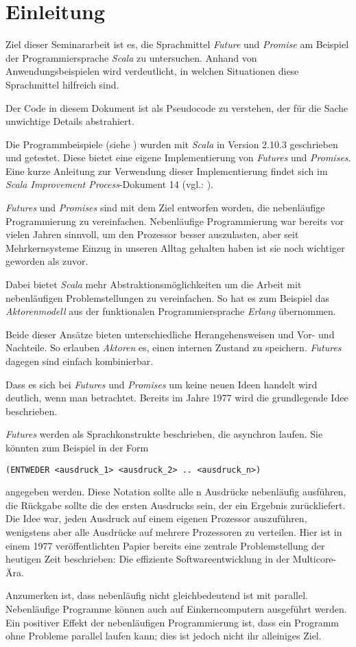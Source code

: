 \section{Einleitung}

Ziel dieser Seminararbeit ist es, die Sprachmittel \emph{Future}
und \emph{Promise} am Beispiel der Programmiersprache \emph{Scala}
zu untersuchen. Anhand von Anwendungsbeispielen wird verdeutlicht, 
in welchen Situationen diese Sprachmittel hilfreich sind.

Der Code in diesem Dokument ist als Pseudocode zu verstehen, der für die
Sache unwichtige Details abstrahiert.

Die Programmbeispiele (siehe \cite{code}) wurden mit
\emph{Scala} in Version 2.10.3 geschrieben und getestet. Diese bietet
eine eigene Implementierung von \emph{Futures} und \emph{Promises}.
Eine kurze Anleitung zur Verwendung dieser Implementierung findet sich im
\emph{Scala Improvement Process}-Dokument 14 (vgl.: \cite{sip14}).

\emph{Futures} und \emph{Promises} sind mit dem Ziel entworfen worden,
die nebenläufige Programmierung zu vereinfachen. Nebenläufige Programmierung
war bereits vor vielen Jahren sinnvoll, um den Prozessor besser auszulasten,
aber seit Mehrkernsysteme Einzug in unseren Alltag gehalten haben
ist sie noch wichtiger geworden als zuvor.

Dabei bietet \emph{Scala} mehr Abstraktionsmöglichkeiten um die Arbeit
mit nebenläufigen Problemstellungen zu vereinfachen. So hat es zum
Beispiel das \emph{Aktorenmodell} aus der funktionalen Programmiersprache
\emph{Erlang} übernommen.

Beide dieser Ansätze bieten unterschiedliche Herangehensweisen und
Vor- und Nachteile. So erlauben \emph{Aktoren} es, einen internen Zustand
zu speichern. \emph{Futures} dagegen sind einfach kombinierbar.

Dass es sich bei \emph{Futures} und \emph{Promises} um keine neuen
Ideen handelt wird deutlich, wenn man \cite{Baker:1977:IGC:872734.806932}
betrachtet. Bereits im Jahre 1977 wird die grundlegende Idee beschrieben.

\emph{Futures} werden als Sprachkonstrukte beschrieben, die asynchron laufen. Sie 
könnten zum Beispiel in der Form 
\begin{lstlisting}
(ENTWEDER <ausdruck_1> <ausdruck_2> .. <ausdruck_n>)
\end{lstlisting}
angegeben werden. Diese Notation sollte alle n Ausdrücke nebenläufig ausführen, 
die Rückgabe sollte die des ersten Ausdrucks sein, der ein Ergebnis zurückliefert.
Die Idee war, jeden Ausdruck auf einem eigenen Prozessor auszuführen, 
wenigstens aber alle Ausdrücke auf mehrere Prozessoren zu verteilen. Hier ist in 
einem 1977 veröffentlichten Papier bereits eine zentrale Problemstellung der 
heutigen Zeit beschrieben: Die effiziente Softwareentwicklung in der Multicore-Ära.

Anzumerken ist, dass nebenläufig nicht gleichbedeutend ist mit parallel.
Nebenläufige Programme können auch auf Einkerncomputern ausgeführt werden.
Ein positiver Effekt der nebenläufigen Programmierung ist, dass ein 
Programm ohne Probleme parallel laufen kann; dies ist jedoch nicht ihr 
alleiniges Ziel.

